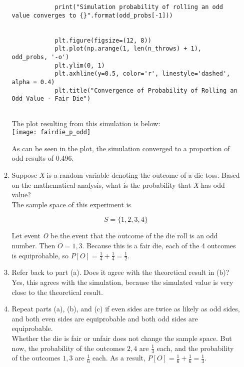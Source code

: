 \documentclass[]{article}
\begin{document}
\begin{enumerate}
\begin{enumerate}
\begin{lstlisting}
			print("Simulation probability of rolling an odd value converges to {}".format(odd_probs[-1]))
			
			
			plt.figure(figsize=(12, 8))
			plt.plot(np.arange(1, len(n_throws) + 1), odd_probs, '-o')
			plt.ylim(0, 1)
			plt.axhline(y=0.5, color='r', linestyle='dashed', alpha = 0.4)
			plt.title("Convergence of Probability of Rolling an Odd Value - Fair Die")
			
		\end{lstlisting}
		
	    The plot resulting from this simulation is below:\\
		
		\texttt{[image: fairdie\_p\_odd]}
		
		As can be seen in the plot, the simulation converged to a proportion of odd results of 0.496.\\
		
		\item Suppose \textit{X} is a random variable denoting the outcome of a die toss. Based on the mathematical analysis, what is the probability that \textit{X} has odd value?\\
		
		The sample space of this experiment is 
		
		\[
		S = \{1, 2, 3, 4\}
		\]
		
		Let event \textit{O} be the event that the outcome of the die roll is an odd number. Then $O = {1, 3}$. Because this is a fair die, each of the 4 outcomes is equiprobable, so $P[O] = \frac{1}{4} + \frac{1}{4} = \frac{1}{2}$.\\
		
		\item Refer back to part (a).  Does it agree with the theoretical result in (b)?\\
		
		Yes, this agrees with the simulation, because the simulated value is very close to the theoretical result.\\
		
		\item Repeat parts (a), (b), and (c) if even sides are twice as likely as odd sides, and both even sides are equiprobable and both odd sides are equiprobable.\\
		
		Whether the die is fair or unfair does not change the sample space. But now, the probability of the outcomes ${2, 4}$ are $\frac{1}{3}$ each, and the probability of the outcomes ${1, 3}$ are $\frac{1}{6}$ each. As a result, $P[O] = \frac{1}{6} + \frac{1}{6} = \frac{1}{3}$.\\
		

\end{enumerate}
\end{enumerate}
\end{document}
